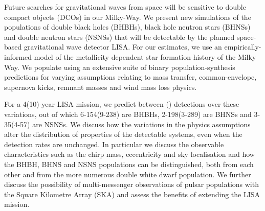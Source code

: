 Future searches for gravitational waves from space will be sensitive to double compact objects (DCOs) in our Milky-Way. We present new simulations of the populations of double black holes (BHBHs), black hole neutron stars (BHNSs) and double neutron stars (NSNSs) that will be detectable by the planned space-based gravitational wave detector LISA. 
%
For our estimates, we use an empirically-informed model of the metallicity dependent star formation history of the Milky Way. We populate using an extensive suite of binary population-synthesis predictions for varying assumptions relating to mass transfer, common-envelope, supernova kicks, remnant masses and wind mass loss physics. 


For a 4(10)-year LISA mission, we predict between \rangeFourYear{}(\rangeTenYear{}) detections over these variations, out of which 6-154(9-238) are BHBHs, 2-198(3-289) are BHNSs and 3-35(4-57) are NSNSs.
%
We discuss how the variations in the physics assumptions alter the distribution of properties of the detectable systems, even when the detection rates are unchanged. In particular we discuss the observable characteristics such as the chirp mass, eccentricity and sky localisation and how the BHBH, BHNS and NSNS populations can be distinguished, both from each other and from the more numerous double white dwarf population. 
%
We further discuss the possibility of multi-messenger observations of pulsar populations with the Square Kilometre Array (SKA) and assess the benefits of extending the LISA mission. 

